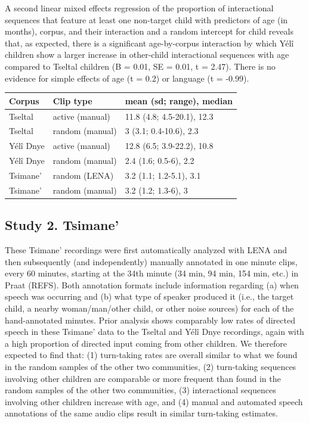 \documentclass[10pt, letterpaper]{article}
\begin{document}
A second linear mixed effects regression of the proportion of
interactional sequences that feature at least one non-target child with
predictors of age (in months), corpus, and their interaction and a
random intercept for child reveals that, as expected, there is a
significant age-by-corpus interaction by which Yélî children show a
larger increase in other-child interactional sequences with age compared
to Tseltal children (B = 0.01, SE = 0.01, t = 2.47). There is no
evidence for simple effects of age (t = 0.2) or language (t = -0.99).

\begin{table}[h]
\centering
\begin{tabular}{lll}
  \hline
Corpus & Clip type & mean (sd; range), median \\ 
  \hline
Tseltal & active (manual) & 11.8 (4.8; 4.5-20.1), 12.3 \\ 
  Tseltal & random (manual) & 3 (3.1; 0.4-10.6), 2.3 \\ 
  Yélî Dnye & active (manual) & 12.8 (6.5; 3.9-22.2), 10.8 \\ 
  Yélî Dnye & random (manual) & 2.4 (1.6; 0.5-6), 2.2 \\ 
  Tsimane' & random (LENA) & 3.2 (1.1; 1.2-5.1), 3.1 \\ 
  Tsimane' & random (manual) & 3.2 (1.2; 1.3-6), 3 \\ 
   \hline
\end{tabular}
\end{table}

\hypertarget{study-2.-tsimane}{%
\subsection{Study 2. Tsimane'}\label{study-2.-tsimane}}

These Tsimane' recordings were first automatically analyzed with LENA
and then subsequently (and independently) manually annotated in one
minute clips, every 60 minutes, starting at the 34th minute (34 min, 94
min, 154 min, etc.) in Praat (REFS). Both annotation formats include
information regarding (a) when speech was occurring and (b) what type of
speaker produced it (i.e., the target child, a nearby woman/man/other
child, or other noise sources) for each of the hand-annotated minutes.
Prior analysis shows comparably low rates of directed speech in these
Tsimane' data to the Tseltal and Yélî Dnye recordings, again with a high
proportion of directed input coming from other children. We therefore
expected to find that: (1) turn-taking rates are overall similar to what
we found in the random samples of the other two communities, (2)
turn-taking sequences involving other children are comparable or more
frequent than found in the random samples of the other two communities,
(3) interactional sequences involving other children increase with age,
and (4) manual and automated speech annotations of the same audio clips
result in similar turn-taking estimates.
\end{document}
